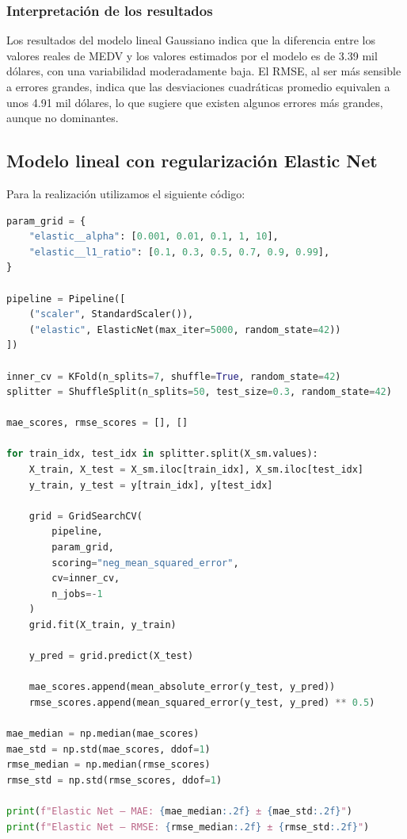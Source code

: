 \documentclass[12pt,a4paper]{article}
\begin{document}
\subsubsection{Interpretación de los resultados}

Los resultados del modelo lineal Gaussiano indica que la diferencia entre los valores reales de MEDV y los valores estimados por el modelo es de 3.39 mil dólares, con una variabilidad moderadamente baja.
El RMSE, al ser más sensible a errores grandes, indica que las desviaciones cuadráticas promedio equivalen a unos 4.91 mil dólares, lo que sugiere que existen algunos errores más grandes, aunque no dominantes.

\subsection{Modelo lineal con regularización Elastic Net}

Para la realización utilizamos el siguiente código:

\begin{lstlisting}[language=Python, frame=single, basicstyle=\ttfamily\small, breaklines=true]
param_grid = {
    "elastic__alpha": [0.001, 0.01, 0.1, 1, 10],
    "elastic__l1_ratio": [0.1, 0.3, 0.5, 0.7, 0.9, 0.99],
}

pipeline = Pipeline([
    ("scaler", StandardScaler()),
    ("elastic", ElasticNet(max_iter=5000, random_state=42))
])

inner_cv = KFold(n_splits=7, shuffle=True, random_state=42)
splitter = ShuffleSplit(n_splits=50, test_size=0.3, random_state=42)

mae_scores, rmse_scores = [], []

for train_idx, test_idx in splitter.split(X_sm.values):
    X_train, X_test = X_sm.iloc[train_idx], X_sm.iloc[test_idx]
    y_train, y_test = y[train_idx], y[test_idx]

    grid = GridSearchCV(
        pipeline,
        param_grid,
        scoring="neg_mean_squared_error",
        cv=inner_cv,
        n_jobs=-1
    )
    grid.fit(X_train, y_train)

    y_pred = grid.predict(X_test)

    mae_scores.append(mean_absolute_error(y_test, y_pred))
    rmse_scores.append(mean_squared_error(y_test, y_pred) ** 0.5)

mae_median = np.median(mae_scores)
mae_std = np.std(mae_scores, ddof=1)
rmse_median = np.median(rmse_scores)
rmse_std = np.std(rmse_scores, ddof=1)

print(f"Elastic Net – MAE: {mae_median:.2f} ± {mae_std:.2f}")
print(f"Elastic Net – RMSE: {rmse_median:.2f} ± {rmse_std:.2f}")
\end{lstlisting}
\end{document}
